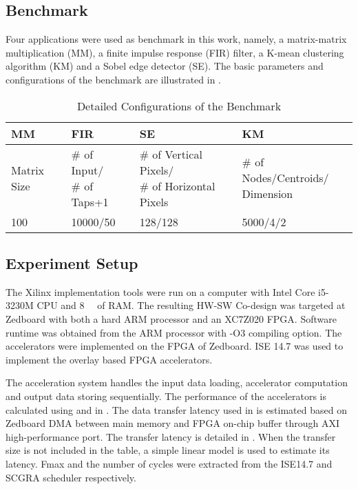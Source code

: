 \subsection{Benchmark} \label{subsec:benchmark}
Four applications were used as benchmark in this work, namely, a matrix-matrix multiplication (MM), a finite impulse response (FIR) filter, a K-mean clustering algorithm (KM) and a Sobel edge detector (SE). The basic parameters and configurations of the benchmark are illustrated in . 

\begin{table}[htb]
    \footnotesize
    \centering
    \caption{Detailed Configurations of the Benchmark 
    \label{tab:benchmark-config}}{
        \centering
            \begin{tabular}{l|l|l|l}
                \hline
                MM & FIR & SE & KM \\ \hline
                Matrix Size & \tabincell{l}{\# of Input/ \\ \# of Taps+1} & \tabincell{l}{ \# of Vertical Pixels/ \\ \# of Horizontal Pixels} & \tabincell{l}{\# of Nodes/Centroids/ \\ Dimension} \\ \hline
                100 & 10000/50 & 128/128 & 5000/4/2  \\ \hline
            \end{tabular}
        }
\end{table}

\subsection{Experiment Setup} \label{subsec:setup}
The Xilinx implementation tools were run on a computer with Intel Core i5-3230M CPU and \SI{8}{\giga\byte} of RAM. The resulting HW-SW Co-design was targeted at Zedboard with both a hard ARM processor and an XC7Z020 FPGA. Software runtime was obtained from the ARM processor with -O3 compiling option. The accelerators were implemented on the FPGA of Zedboard. ISE 14.7 was used to implement the overlay based FPGA accelerators. 

The acceleration system handles the input data loading, accelerator computation and output data storing sequentially. The performance of the accelerators is calculated using  and  in . The data transfer latency used in  is estimated based on Zedboard DMA between main memory and FPGA on-chip buffer through AXI high-performance port. The transfer latency is detailed in . When the transfer size is not included in the table, a simple linear model is used to estimate its latency. Fmax and the number of cycles were extracted from the ISE14.7 and SCGRA scheduler respectively. 
 
